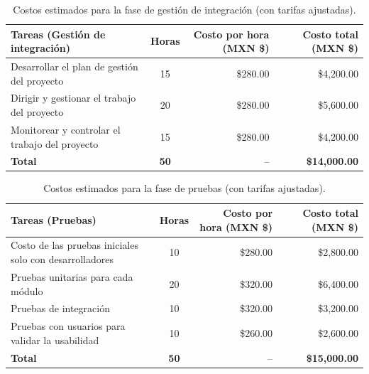 \begin{table}[H]
	\centering
	\renewcommand{\arraystretch}{1.6}
	\setlength{\tabcolsep}{10pt}
	\Huge
	\begin{adjustbox}{max width=\textwidth}
		\begin{tabular}{|p{9.5cm}|c|r|r|}
			\hline
			\textbf{Tareas (Gestión de integración)} & \textbf{Horas} & \textbf{Costo por hora (MXN \$)} & \textbf{Costo total (MXN \$)} \\ \hline
			Desarrollar el plan de gestión del proyecto & 15 & \$280.00 & \$4,200.00 \\ \hline
			Dirigir y gestionar el trabajo del proyecto & 20 & \$280.00 & \$5,600.00 \\ \hline
			Monitorear y controlar el trabajo del proyecto & 15 & \$280.00 & \$4,200.00 \\ \hline
			\textbf{Total} & \textbf{50} & -- & \textbf{\$14,000.00} \\ \hline
		\end{tabular}
	\end{adjustbox}
	\caption{Costos estimados para la fase de gestión de integración (con tarifas ajustadas).}
	\label{tab:costos_integracion_actualizado}
\end{table}

\begin{table}[H]
	\centering
	\renewcommand{\arraystretch}{1.6}
	\setlength{\tabcolsep}{10pt}
	\Huge
	\begin{adjustbox}{max width=\textwidth}
		\begin{tabular}{|p{9.5cm}|c|r|r|}
			\hline
			\textbf{Tareas (Pruebas)} & \textbf{Horas} & \textbf{Costo por hora (MXN \$)} & \textbf{Costo total (MXN \$)} \\ \hline
			Costo de las pruebas iniciales solo con desarrolladores & 10 & \$280.00 & \$2,800.00 \\ \hline
			Pruebas unitarias para cada módulo & 20 & \$320.00 & \$6,400.00 \\ \hline
			Pruebas de integración & 10 & \$320.00 & \$3,200.00 \\ \hline
			Pruebas con usuarios para validar la usabilidad & 10 & \$260.00 & \$2,600.00 \\ \hline
			\textbf{Total} & \textbf{50} & -- & \textbf{\$15,000.00} \\ \hline
		\end{tabular}
	\end{adjustbox}
	\caption{Costos estimados para la fase de pruebas (con tarifas ajustadas).}
	\label{tab:costos_pruebas_actualizado}
\end{table}

